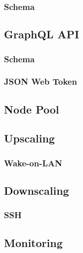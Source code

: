 \subsubsection{Schema}
\label{subsubsec:implementation_server_database_schema}

\subsection{GraphQL API}
\label{subsec:implementation_server_graphql}

\subsubsection{Schema}
\label{subsubsec:implementation_server_graphql_schema}

\subsubsection{JSON Web Token}
\label{subsubsec:implementation_server_graphql_json_web_token}

\subsection{Node Pool}
\label{subsec:implementation_server_node_pool}

\subsection{Upscaling}
\label{subsec:implementation_server_upscaling}

\subsubsection{Wake-on-LAN}
\label{subsubsec:implementation_server_scale_up_wake_on_lan}

\subsection{Downscaling}
\label{subsec:implementation_server_downscaling}

\subsubsection{SSH}
\label{subsubsec:implementation_server_scale_up_ssh}

\subsection{Monitoring}
\label{subsec:implementation_server_monitoring}

